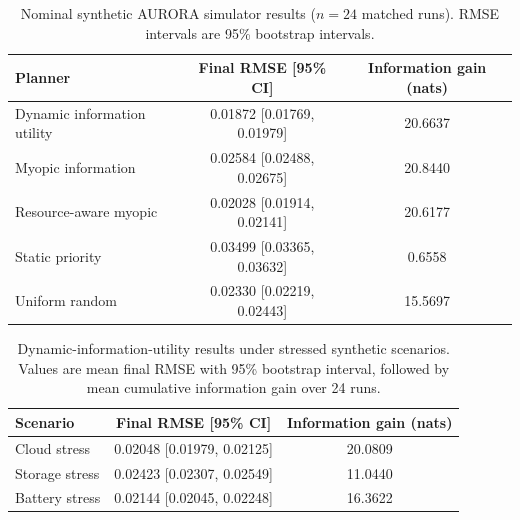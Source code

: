 \documentclass[11pt,a4paper]{article}
\begin{document}
\begin{table}[!htbp]
\centering
\caption{Nominal synthetic AURORA simulator results
($n=24$ matched runs). RMSE intervals are 95\% bootstrap intervals.}
\label{tab:aurora-results}
\begin{tabular}{lcc}
\toprule
Planner & Final RMSE [95\% CI] & Information gain (nats)\\
\midrule
Dynamic information utility & 0.01872 [0.01769, 0.01979] & 20.6637\\
Myopic information & 0.02584 [0.02488, 0.02675] & 20.8440\\
Resource-aware myopic & 0.02028 [0.01914, 0.02141] & 20.6177\\
Static priority & 0.03499 [0.03365, 0.03632] & 0.6558\\
Uniform random & 0.02330 [0.02219, 0.02443] & 15.5697\\
\bottomrule
\end{tabular}
\end{table}

\begin{table}[!htbp]
\centering
\caption{Dynamic-information-utility results under stressed synthetic
scenarios. Values are mean final RMSE with 95\% bootstrap interval,
followed by mean cumulative information gain over 24 runs.}
\label{tab:aurora-stress}
\begin{tabular}{lcc}
\toprule
Scenario & Final RMSE [95\% CI] & Information gain (nats)\\
\midrule
Cloud stress & 0.02048 [0.01979, 0.02125] & 20.0809\\
Storage stress & 0.02423 [0.02307, 0.02549] & 11.0440\\
Battery stress & 0.02144 [0.02045, 0.02248] & 16.3622\\
\bottomrule
\end{tabular}
\end{table}
\end{document}
